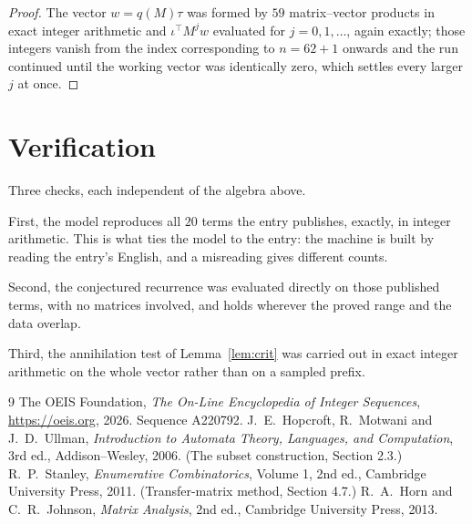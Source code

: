 \documentclass[11pt,a4paper]{article}
\theoremstyle{plain}
\theoremstyle{definition}
\begin{document}
\begin{proof}
The vector $w=q(M)\tau$ was formed by $59$ matrix--vector products in exact integer
arithmetic and $\iota^{\!\top}M^{j}w$ evaluated for $j=0,1,\dots$, again exactly; those
integers vanish from the index corresponding to $n=62+1$ onwards and the run continued
until the working vector was identically zero, which settles every larger $j$ at once.
\end{proof}

\section{Verification}

Three checks, each independent of the algebra above.

First, the model reproduces all $20$ terms the entry publishes, exactly, in integer
arithmetic. This is what ties the model to the entry: the machine is built by reading the
entry's English, and a misreading gives different counts.

Second, the conjectured recurrence was evaluated directly on those published terms, with no
matrices involved, and holds wherever the proved range and the data overlap.

Third, the annihilation test of Lemma~\ref{lem:crit} was carried out in exact integer
arithmetic on the whole vector rather than on a sampled prefix.

\begin{thebibliography}{9}
 The OEIS Foundation, \emph{The On-Line Encyclopedia of Integer
Sequences}, \url{https://oeis.org}, 2026. Sequence A220792.
 J.~E.~Hopcroft, R.~Motwani and J.~D.~Ullman, \emph{Introduction to Automata
Theory, Languages, and Computation}, 3rd ed., Addison--Wesley, 2006. (The subset
construction, Section 2.3.)
 R.~P.~Stanley, \emph{Enumerative Combinatorics}, Volume 1, 2nd ed.,
Cambridge University Press, 2011. (Transfer-matrix method, Section 4.7.)
 R.~A.~Horn and C.~R.~Johnson, \emph{Matrix Analysis}, 2nd ed., Cambridge
University Press, 2013.
\end{thebibliography}
\end{document}
